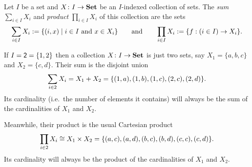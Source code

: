 \documentclass[Book-Poly]{subfiles}
\begin{document}
\begin{definition}
Let $I$ be a set and $X\colon I\to\textbf{Set}$ be an $I$-indexed collection of sets. The \emph{sum} $\sum_{i\in I}X_i$ and \emph{product} $\prod_{i\in I}X_i$ of this collection are the sets
\[
\sum_{i\in I}X_i:=\{(i,x)\mid i\in I\text{ and }x\in X_i\}
\qquad\text{and}\qquad
\prod_{i\in I}X_i:=\{f : (i \in I) \to X_i\}.
\]
\end{definition}

\begin{example}\label{ex.two_sums_and_prods}
If $I=\textsf{2}=\{1,2\}$ then a collection $X\colon I\to \textbf{Set}$ is just two sets, say $X_1=\{a,b,c\}$ and $X_2=\{c,d\}$. Their sum is the disjoint union
\[\sum_{i\in \textsf{2}}X_i=X_1+X_2=\{(1,a),(1,b),(1,c),(2,c),(2,d)\}.\]
Its cardinality (i.e.\ the number of elements it contains) will always be the sum of the cardinalities of $X_1$ and $X_2$.

Meanwhile, their product is the usual Cartesian product
\[\prod_{i\in \textsf{2}}X_i \cong X_1\times X_2=\{(a,c),(a,d),(b,c),(b,d),(c,c),(c,d)\}.\]
Its cardinality will always be the product of the cardinalities of $X_1$ and $X_2$.
\end{example}
\end{document}
